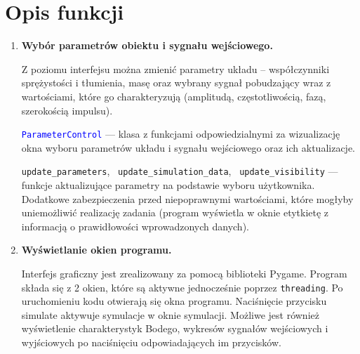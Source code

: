 \documentclass[10pt, a4paper]{article}
\begin{document}

\section{Opis funkcji}

\begin{enumerate}[label=\alph*.]
  \item \textbf{Wybór parametrów obiektu i sygnału wejściowego.} \par\vspace{0.1cm}
  Z poziomu interfejsu można zmienić parametry układu – współczynniki sprężystości i tłumienia, masę oraz wybrany sygnał pobudzający wraz z wartościami, które go charakteryzują 
  (amplitudą, częstotliwością, fazą, szerokością impulsu). 

  \vspace{0.1cm}

  \textcolor{blue}{\texttt{ParameterControl}} --- klasa z funkcjami odpowiedzialnymi za wizualizację okna wyboru parametrów układu i sygnału wejściowego oraz ich aktualizacje.
  
  \vspace{0.1cm}

  {\texttt{update\_parameters}}, \ {\texttt{update\_simulation\_data}}, \ {\texttt{update\_visibility}} --- funkcje aktualizujące parametry na podstawie wyboru użytkownika.
  Dodatkowe zabezpieczenia przed niepoprawnymi wartościami, które mogłyby uniemożliwić realizację zadania (program wyświetla w oknie etytkietę z informacją o prawidłowości wprowadzonych danych).

  \vspace{0.2cm}
  
  \item \textbf{Wyświetlanie okien programu.} \par\vspace{0.1cm}
  Interfejs graficzny jest zrealizowany za pomocą biblioteki Pygame. Program składa się z 2 okien, które są aktywne jednocześnie poprzez {\texttt{threading}}. Po uruchomieniu kodu otwierają się okna programu. Naciśnięcie przycisku simulate aktywuje symulacje w oknie symulacji.
  Możliwe jest również wyświetlenie charakterystyk Bodego, wykresów sygnałów wejściowych i wyjściowych po naciśnięciu odpowiadających im przycisków.

  \vspace{0.1cm}


\end{enumerate}
\end{document}

